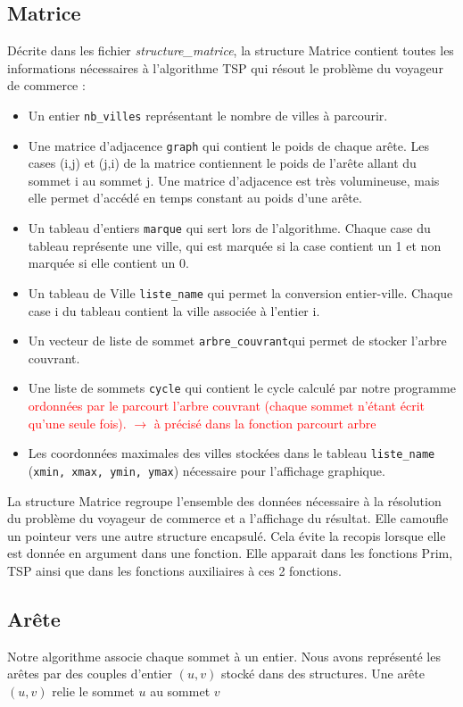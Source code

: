\documentclass[a4paper,11pt]{article}
\begin{document}
\subsection{Matrice} %
Décrite dans les fichier \emph{structure\_matrice}, la structure \textsf{Matrice} contient toutes les informations nécessaires à l'algorithme TSP qui résout le problème du voyageur de commerce :
\begin{itemize}
\renewcommand{\FrenchLabelItem}{\textbullet}
\item Un entier \texttt{nb\_villes} représentant le nombre de villes à parcourir.
\item Une matrice d'adjacence \texttt{graph} qui contient le poids de chaque arête. Les cases (i,j) et (j,i) de la matrice contiennent le poids de l'arête allant du sommet i au sommet j. Une matrice d'adjacence est très volumineuse, mais elle permet d'accédé en temps constant au poids d'une arête.
\item Un tableau d'entiers \texttt{marque} qui sert lors de l'algorithme. Chaque case du tableau représente une ville, qui est marquée si la case contient un 1 et non marquée si elle contient un 0.
\item Un tableau de \textsf{Ville} \texttt{liste\_name} qui permet la conversion entier-ville. Chaque case i du tableau contient la ville associée à l'entier i.
\item Un vecteur de liste de sommet \texttt{arbre\_couvrant}qui permet de stocker l'arbre couvrant.
\item Une liste de sommets \texttt{cycle} qui contient le cycle calculé par notre programme \textcolor{red}{ ordonnées par le parcourt l'arbre couvrant (chaque sommet n'étant écrit qu'une seule fois). $\rightarrow$ à précisé dans la fonction parcourt arbre}
\item Les coordonnées maximales des villes stockées dans le tableau \texttt{liste\_name} (\texttt{xmin, xmax, ymin, ymax}) nécessaire pour l'affichage graphique.
\end{itemize}

La structure Matrice regroupe l'ensemble des données nécessaire à la résolution du problème du voyageur de commerce et a l’affichage du résultat.
Elle camoufle un pointeur vers une autre structure encapsulé. Cela évite la recopis lorsque elle est donnée en argument dans une fonction. Elle apparait dans les fonctions Prim, TSP ainsi que dans les fonctions auxiliaires à ces 2 fonctions.\\

\subsection{Arête}
Notre algorithme associe chaque sommet à un entier. Nous avons représenté les arêtes par des couples d'entier $(u, v)$ stocké dans des structures. Une arête $(u, v)$ relie le sommet $u$ au sommet $v$
\end{document}
